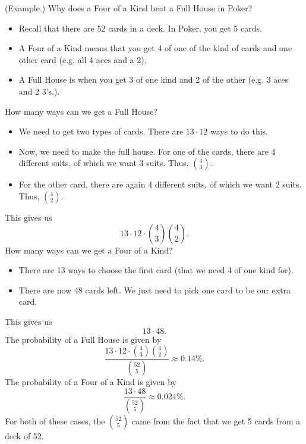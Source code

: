 \begin{mdframed}[]
    (Example.) Why does a Four of a Kind beat a Full House in Poker? 
    \begin{itemize}
        \item Recall that there are 52 cards in a deck. In Poker, you get 5 cards. 
        \item A Four of a Kind means that you get 4 of one of the kind of cards and one other card (e.g. all 4 aces and a 2).
        \item A Full House is when you get 3 of one kind and 2 of the other (e.g. 3 aces and 2 3's.).
    \end{itemize}

    \begin{mdframed}[]
        How many ways can we get a Full House? 
        \begin{itemize}
            \item We need to get two types of cards. There are $13 \cdot 12$ ways to do this.
            \item Now, we need to make the full house. For one of the cards, there are 4 different suits, of which we want 3 suits. Thus, $\binom{4}{3}$.
            \item For the other card, there are again 4 different suits, of which we want 2 suits. Thus, $\binom{4}{2}$. 
        \end{itemize}
        This gives us 
        \[13 \cdot 12 \cdot \binom{4}{3} \binom{4}{2}.\]
        How many ways can we get a Four of a Kind? 
        \begin{itemize}
            \item There are 13 ways to choose the first card (that we need 4 of one kind for).
            \item There are now 48 cards left. We just need to pick one card to be our extra card.
        \end{itemize}
        This gives us 
        \[13 \cdot 48.\]
        The probability of a Full House is given by 
        \[\frac{13 \cdot 12 \cdot \binom{4}{3} \binom{4}{2}}{\binom{52}{5}} \approx 0.14\%.\]
        The probability of a Four of a Kind is given by 
        \[\frac{13 \cdot 48}{\binom{52}{5}} \approx 0.024\%.\]
        For both of these cases, the $\binom{52}{5}$ came from the fact that we get 5 cards from a deck of 52. 
    \end{mdframed}
\end{mdframed}

